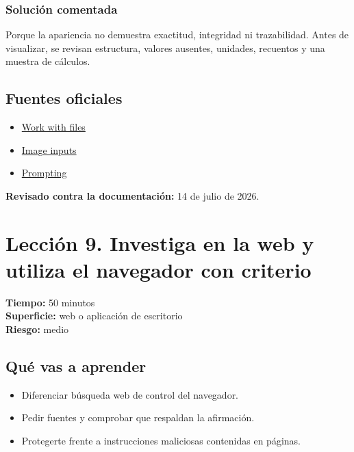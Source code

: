 \documentclass[10pt,a4paper,openany]{book}
\providecommand{\tightlist}{\setlength{\itemsep}{0.18em}\setlength{\parskip}{0pt}}
\begin{document}
\subsubsection{Solución comentada}\label{soluciuxf3n-comentada-8}

Porque la apariencia no demuestra exactitud, integridad ni trazabilidad.
Antes de visualizar, se revisan estructura, valores ausentes, unidades,
recuentos y una muestra de cálculos.

\subsection{Fuentes oficiales}\label{fuentes-oficiales-7}

\begin{itemize}
\tightlist
\item
  \href{https://learn.chatgpt.com/docs/artifacts-viewer}{Work with
  files}
\item
  \href{https://learn.chatgpt.com/docs/image-inputs}{Image inputs}
\item
  \href{https://learn.chatgpt.com/docs/prompting}{Prompting}
\end{itemize}

\textbf{Revisado contra la documentación:} 14 de julio de 2026.

\clearpage

\section{Lección 9. Investiga en la web y utiliza el navegador con
criterio}\label{lecciuxf3n-9.-investiga-en-la-web-y-utiliza-el-navegador-con-criterio}

\begin{metabox}

\textbf{Tiempo:} 50 minutos\\
\textbf{Superficie:} web o aplicación de escritorio\\
\textbf{Riesgo:} medio

\end{metabox}

\subsection{Qué vas a aprender}\label{quuxe9-vas-a-aprender-8}

\begin{itemize}
\tightlist
\item
  Diferenciar búsqueda web de control del navegador.
\item
  Pedir fuentes y comprobar que respaldan la afirmación.
\item
  Protegerte frente a instrucciones maliciosas contenidas en páginas.
\end{itemize}
\end{document}
